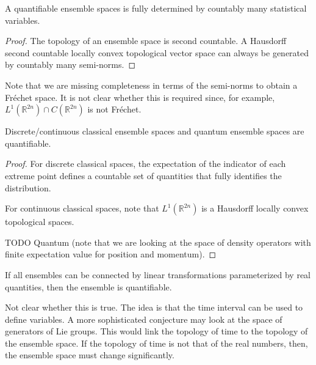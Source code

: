 \begin{coro}
	A quantifiable ensemble spaces is fully determined by countably many statistical variables.
\end{coro}

\begin{proof}
	The topology of an ensemble space is second countable. A Hausdorff second countable locally convex topological vector space can always be generated by countably many semi-norms.
\end{proof}

\begin{remark}
	Note that we are missing completeness in terms of the semi-norms to obtain a Fr\'echet space. It is not clear whether this is required since, for example, $L^1(\mathbb{R}^{2n}) \cap C(\mathbb{R}^{2n})$ is not Fr\'echet.
\end{remark}

\begin{conj}
	Discrete/continuous classical ensemble spaces and quantum ensemble spaces are quantifiable.
\end{conj}

\begin{proof}
	For discrete classical spaces, the expectation of the indicator of each extreme point defines a countable set of quantities that fully identifies the distribution.
	
	For continuous classical spaces, note that $L^1(\mathbb{R}^{2n})$ is a Hausdorff locally convex topological spaces.
	
	TODO Quantum (note that we are looking at the space of density operators with finite expectation value for position and momentum).
\end{proof}

\begin{conj}
	If all ensembles can be connected by linear transformations parameterized by real quantities, then the ensemble is quantifiable.
\end{conj}

\begin{remark}
	Not clear whether this is true. The idea is that the time interval can be used to define variables. A more sophisticated conjecture may look at the space of generators of Lie groups. This would link the topology of time to the topology of the ensemble space. If the topology of time is not that of the real numbers, then, the ensemble space must change significantly.
\end{remark}

